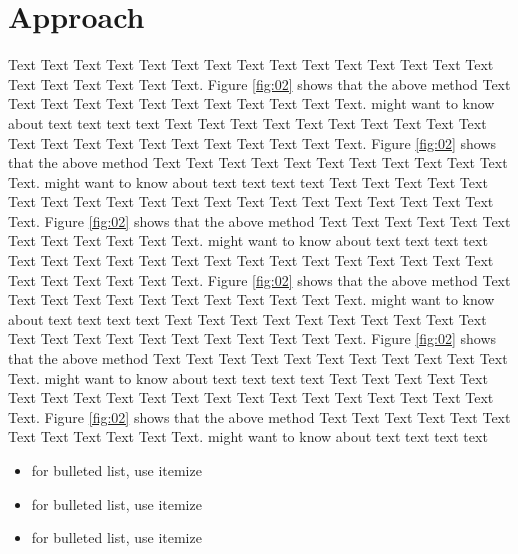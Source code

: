 \documentclass{Rpd}
\begin{document}
\section{Approach}

Text Text Text Text Text Text  Text Text Text Text Text Text Text Text Text  Text Text Text Text Text Text. Figure \ref{fig:02} shows that the above method  Text Text Text Text  Text Text Text Text Text Text  Text Text.  \cite{Boffelli03} might want to know about  text text text text
Text Text Text Text Text Text  Text Text Text Text Text Text Text Text Text  Text Text Text Text Text Text. Figure \ref{fig:02} shows that the above method  Text Text Text Text  Text Text Text Text Text Text  Text Text.  \cite{Boffelli03} might want to know about  text text text text
Text Text Text Text Text Text  Text Text Text Text Text Text Text Text Text  Text Text Text Text Text Text. Figure \ref{fig:02} shows that the above method  Text Text Text Text  Text Text Text Text Text Text  Text Text.  \cite{Boffelli03} might want to know about  text text text text
Text Text Text Text Text Text  Text Text Text Text Text Text Text Text Text  Text Text Text Text Text Text. Figure \ref{fig:02} shows that the above method  Text Text Text Text  Text Text Text Text Text Text  Text Text.  \cite{Boffelli03} might want to know about  text text text text
Text Text Text Text Text Text  Text Text Text Text Text Text Text Text Text  Text Text Text Text Text Text. Figure \ref{fig:02} shows that the above method  Text Text Text Text  Text Text Text Text Text Text  Text Text.  \cite{Boffelli03} might want to know about  text text text text
Text Text Text Text Text Text  Text Text Text Text Text Text Text Text Text  Text Text Text Text Text Text. Figure \ref{fig:02} shows that the above method  Text Text Text Text  Text Text Text Text Text Text  Text Text.  \cite{Boffelli03} might want to know about  text text text text

\begin{itemize}
\item for bulleted list, use itemize
\item for bulleted list, use itemize
\item for bulleted list, use itemize
\end{itemize}
\end{document}
